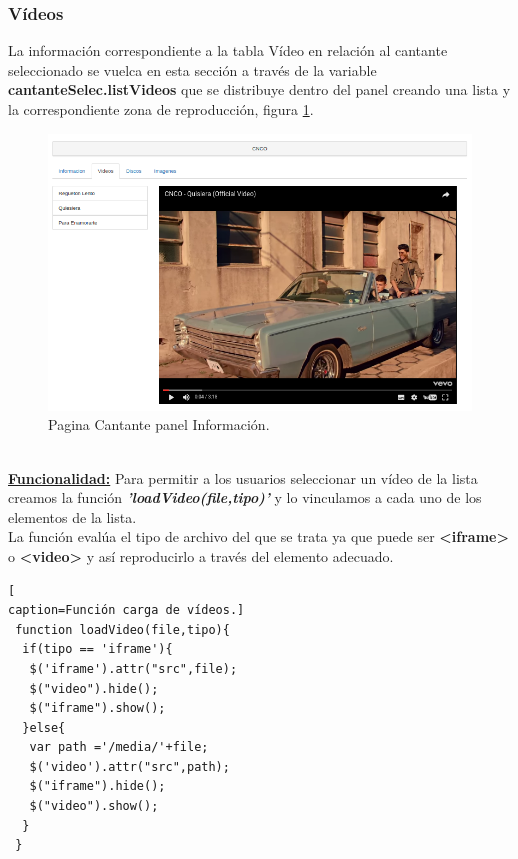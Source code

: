 \subsubsection*{Vídeos}
La información correspondiente a la tabla Vídeo en relación al cantante seleccionado se vuelca en esta sección a través de la variable \textbf{cantanteSelec.listVideos} que se distribuye dentro del panel creando una lista  y la correspondiente zona de reproducción, figura \ref{fig:Video_Cantante}.
\begin{figure}[!h]
\begin{center}
   \includegraphics[width=0.5\linewidth]{Figures/videos_Cantante}
	\decoRule
	\caption[Cantante panel Información]{Pagina Cantante panel Información.}
\label{fig:Video_Cantante}
\end{center}
\end{figure}
\\\underline{\textbf{Funcionalidad:}} Para permitir a los usuarios seleccionar un vídeo de la lista creamos la función \textit{\textbf{'loadVideo(file,tipo)'}} y lo vinculamos a cada uno de los elementos de la lista.
\\La función evalúa el tipo de archivo del que se trata ya que puede ser \textbf{<iframe>} o \textbf{<video>} y así reproducirlo a través del elemento adecuado.
\begin{lstlisting}[
caption=Función carga de vídeos.]
 function loadVideo(file,tipo){
  if(tipo == 'iframe'){
   $('iframe').attr("src",file);
   $("video").hide();
   $("iframe").show();
  }else{
   var path ='/media/'+file;
   $('video').attr("src",path);
   $("iframe").hide();
   $("video").show();
  }
 }
\end{lstlisting}
